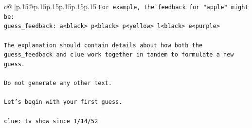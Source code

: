 \documentclass{article}
\begin{document}
{\begin{supertabular}{c@{$\;$}|p{.15\linewidth}@{}p{.15\linewidth}p{.15\linewidth}p{.15\linewidth}p{.15\linewidth}p{.15\linewidth}}
{{{\texttt{For example, the feedback for "apple" might be:} \\
\texttt{guess\_feedback: a<black> p<black> p<yellow> l<black> e<purple>} \\
\\ 
\texttt{The explanation should contain details about how both the guess\_feedback and clue work together in tandem to formulate a new guess.} \\
\\ 
\texttt{Do not generate any other text.} \\
\\ 
\texttt{Let's begin with your first guess.} \\
\\ 
\texttt{clue: tv show since 1/14/52} \\
            }
        }
    }
     \\ \\


\end{supertabular}}
\end{document}
